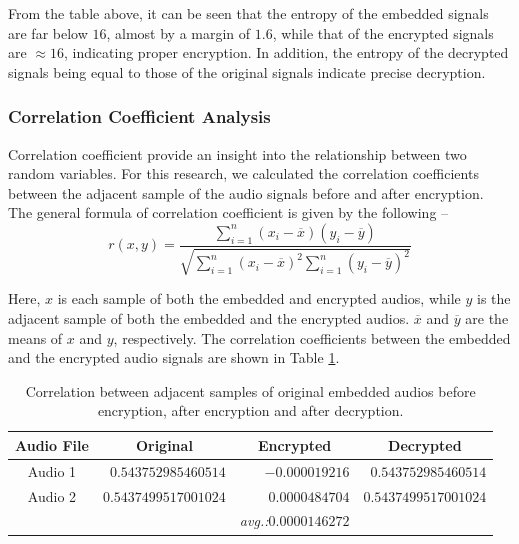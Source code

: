 \documentclass[a4paper]{cas-sc}
\begin{document}
From the table above, it can be seen that the entropy of the embedded signals are far below $16$, almost by a margin of $1.6$, while that of the encrypted signals are $\approx16$, indicating proper encryption. In addition, the entropy of the decrypted signals being equal
to those of the original signals indicate precise decryption.
\subsubsection{Correlation Coefficient Analysis}
Correlation coefficient provide an insight into the relationship between two random variables. For this research, we calculated the correlation coefficients between the adjacent sample of the audio signals before and after encryption. The general formula of correlation coefficient is given by the following --
\begin{equation}
    r(x,y)=\frac{\sum_{i=1}^{n}(x_i-\overline{x})(y_i-\overline{y})}{\sqrt{\sum_{i=1}^{n}(x_i-\overline{x})^2\sum_{i=1}^{n}(y_i-\overline{y})^2}}
\end{equation}

Here, $x$ is each sample of both the embedded and encrypted audios, while $y$ is the adjacent sample of both the embedded and the encrypted audios. $\overline{x}$ and $\overline{y}$ are the means of $x$ and $y$, respectively. The correlation coefficients between the embedded and the encrypted audio signals are shown in Table \ref{table:corrcoef}.
\begin{table}[pos=h]
    \begin{center}
        \caption{Correlation between adjacent samples of original embedded audios before encryption, after encryption and after decryption.}
        \begin{tabular}{crrr}
            \hline
            \multicolumn{1}{c|}{Audio File} & \multicolumn{1}{c}{Original} & \multicolumn{1}{c}{Encrypted} & \multicolumn{1}{c}{Decrypted} \\ \hline
            \multicolumn{1}{c|}{Audio 1}    & $0.543752985460514$          & $-0.000019216$                & $0.543752985460514$           \\
            \multicolumn{1}{c|}{Audio 2}    & $0.5437499517001024$         & $0.0000484704$                & $0.5437499517001024$          \\ \hline
            & & \textit{avg.:}$\mathbf{0.0000146272}$ & \\ 
        \end{tabular}
        \label{table:corrcoef}
    \end{center}
\end{table}
\end{document}
